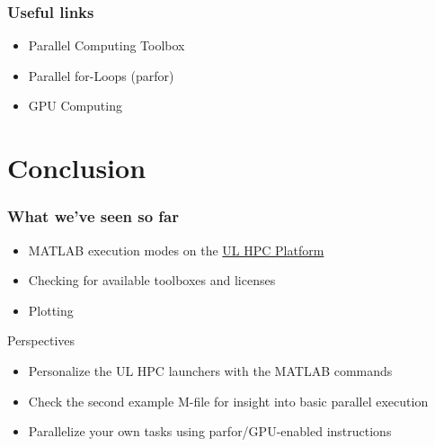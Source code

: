 \documentclass{beamer}
\newcommand{\ULHPC}{\href{http://hpc.uni.lu}{UL HPC Platform}\xspace}
\begin{document}
\begin{frame}
  \frametitle{Useful links}
  \begin{itemize}
   \item Parallel Computing Toolbox \hfill{}
   \item Parallel for-Loops (parfor) \hfill{}
   \item GPU Computing \hfill{}
  \end{itemize}
\end{frame}


\section{Conclusion}
\begin{frame}
  \frametitle{What we've seen so far}
   
   \begin{itemize}
     \item MATLAB execution modes on the \ULHPC
     \item Checking for available toolboxes and licenses
     \item Plotting
   \end{itemize}

    \begin{block}{Perspectives}
      \begin{itemize}
        \item Personalize the UL HPC launchers with the MATLAB commands
        \item Check the second example M-file for insight into basic parallel execution
        \item Parallelize your own tasks using parfor/GPU-enabled instructions
      \end{itemize}
    \end{block}

\end{frame}


\end{document}
